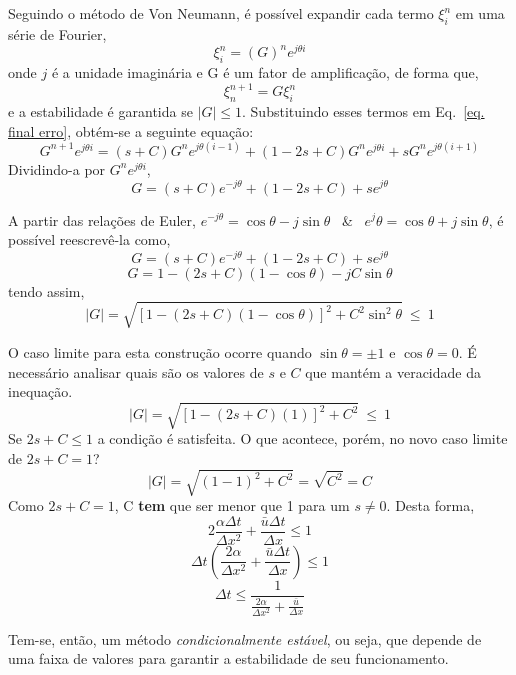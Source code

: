Seguindo o método de Von Neumann, é possível expandir cada termo $\xi_i^n$ em
uma série de Fourier,
\begin{equation}
    \xi_i^n = (G)^n e^{j \theta i}
\end{equation}
onde $j$ é a unidade imaginária e G é um fator de amplificação, de forma que,
\begin{equation}
    \xi_n^{n+1} = G\xi_i^n
\end{equation}
e a estabilidade é garantida se $|G| \leq 1$. Substituindo esses termos em Eq.\
\ref{eq. final erro}, obtém-se a seguinte equação:
\begin{equation}
    G^{n+1}e^{j \theta i} =
      (s + C)G^n e^{j \theta (i-1)}
      + (1 - 2s + C)G^n e^{j \theta i}
      + s G^n e^{j \theta (i+1)}
\end{equation}
Dividindo-a por $G^n e^{j \theta i}$,
\[
    G = (s + C)e^{-j \theta} + (1 - 2s + C) + se^{j \theta}
\]

A partir das relações de Euler, $e^{-j \theta} = \cos\theta - j\sin\theta$ \ \&
\ $e^j\theta = \cos\theta + j\sin\theta$, é possível reescrevê-la como,
\[
    G = (s + C)e^{-j \theta} + (1 - 2s + C) + se^{j \theta}
\]
\[
    G = 1 - (2s + C)(1 - \cos\theta) - jC\sin\theta
\]
tendo assim,
\begin{equation}
    |G| = \sqrt{[1 - (2s + C)(1-\cos\theta)]^2 + C^2\sin^2\theta}\ \leq\ 1
\end{equation}

O caso limite para esta construção ocorre quando $\sin\theta = \pm 1$ e
$\cos\theta = 0$. É necessário analisar quais são os valores de $s$ e $C$ que
mantém a veracidade da inequação.
\[
    |G| = \sqrt{[1 - (2s + C)(1)]^2 + C^2} \ \leq\ 1
\]
Se $2s + C \leq 1$ a condição é satisfeita. O que acontece, porém, no novo caso
limite de $2s + C = 1$?
\[
    |G| = \sqrt{(1-1)^2 + C^2} = \sqrt{C^2} = C
\]
Como $2s + C = 1$, C \textbf{tem} que ser menor que 1 para um $s \neq 0$. Desta
forma,
\[
    2\frac{\alpha\Delta t}{\Delta x^2} + \frac{\bar{u}\Delta t}{\Delta x} \leq 1
\]
\[
    \Delta t
    \left(
        \frac{2\alpha}{\Delta x^2} + \frac{\bar{u}\Delta t}{\Delta x}
    \right) \leq 1
\]
\begin{equation}
    \Delta t
    \leq
    \frac{1}{\frac{2\alpha}{\Delta x^2} + \frac{\bar{u}}{\Delta x}}
\end{equation}

Tem-se, então, um método \emph{condicionalmente estável}, ou seja, que depende
de uma faixa de valores para garantir a estabilidade de seu funcionamento.

